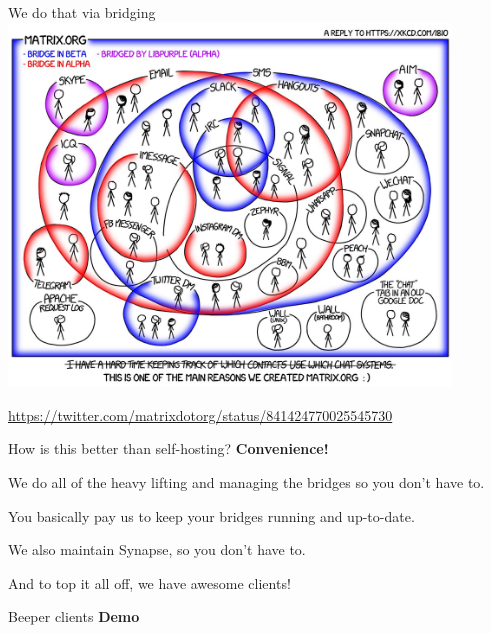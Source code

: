 \documentclass{acm}
\begin{document}
\begin{frame}{We do that via bridging}
    \centering
    \includegraphics[width=0.88\textwidth]{graphics/matrix_bridging}

    \tiny
    \url{https://twitter.com/matrixdotorg/status/841424770025545730}
\end{frame}

\begin{frame}{How is this better than self-hosting?}
    \textbf{Convenience!}
    \pause

    We do all of the heavy lifting and managing the bridges so you don't have
    to.

    You basically pay us to keep your bridges running and up-to-date.
    \pause

    We also maintain Synapse, so you don't have to.
    \pause

    And to top it all off, we have awesome clients!
\end{frame}

\begin{frame}{Beeper clients}
    \Huge
    \textbf{Demo}
\end{frame}
\end{document}

